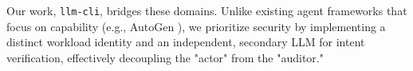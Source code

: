 Our work, \texttt{llm-cli}, bridges these domains. Unlike existing agent frameworks that focus on capability (e.g., AutoGen \cite{autogen}), we prioritize security by implementing a distinct workload identity and an independent, secondary LLM for intent verification, effectively decoupling the "actor" from the "auditor."

